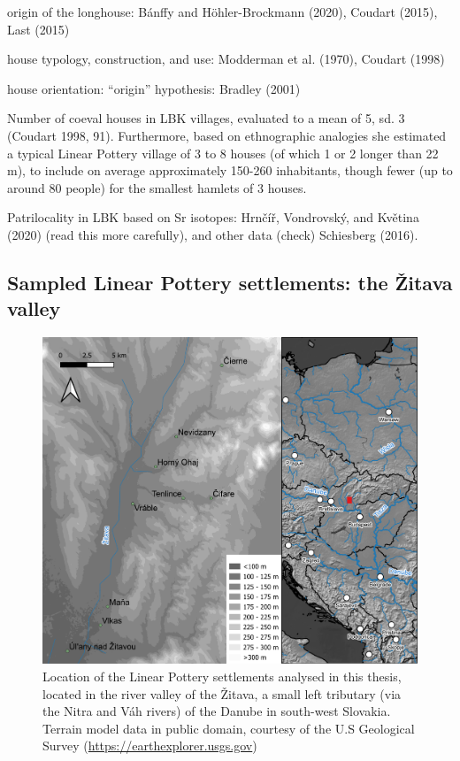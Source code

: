 \documentclass[
  12pt,
  a4paper, twoside]{book}
\begin{document}
origin of the longhouse: Bánffy and Höhler-Brockmann (2020), Coudart (2015), Last (2015)

house typology, construction, and use: Modderman et al. (1970), Coudart (1998)

house orientation: ``origin'' hypothesis: Bradley (2001)

Number of coeval houses in LBK villages, evaluated to a mean of 5, sd. 3 (Coudart 1998, 91). Furthermore, based on ethnographic analogies she estimated a typical Linear Pottery village of 3 to 8 houses (of which 1 or 2 longer than 22 m), to include on average approximately 150-260 inhabitants, though fewer (up to around 80 people) for the smallest hamlets of 3 houses.

Patrilocality in LBK based on Sr isotopes: Hrnčíř, Vondrovský, and Květina (2020) (read this more carefully), and other data (check) Schiesberg (2016).

\hypertarget{sampled-linear-pottery-settlements-the-ux17eitava-valley}{%
\subsection{Sampled Linear Pottery settlements: the Žitava valley}\label{sampled-linear-pottery-settlements-the-ux17eitava-valley}}



\begin{figure}

{\centering \includegraphics[width=0.9\linewidth]{Results/fig03_zitava} 

}

\caption[Map with location of analysed Linear Pottery sites]{Location of the Linear Pottery settlements analysed in this thesis, located in the river valley of the Žitava, a small left tributary (via the Nitra and Váh rivers) of the Danube in south-west Slovakia. Terrain model data in public domain, courtesy of the U.S Geological Survey (\url{https://earthexplorer.usgs.gov})}\label{fig:03-zitava}
\end{figure}
\end{document}

